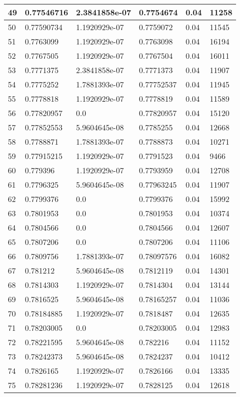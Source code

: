 \begin{longtable}{|l|l|l|l|l|l|}
49 & 0.77546716 & 2.3841858e-07 & 0.7754674 & 0.04 & 11258 \\ \hline 
50 & 0.77590734 & 1.1920929e-07 & 0.7759072 & 0.04 & 11545 \\ \hline 
51 & 0.7763099 & 1.1920929e-07 & 0.7763098 & 0.04 & 16194 \\ \hline 
52 & 0.7767505 & 1.1920929e-07 & 0.7767504 & 0.04 & 16011 \\ \hline 
53 & 0.7771375 & 2.3841858e-07 & 0.7771373 & 0.04 & 11907 \\ \hline 
54 & 0.7775252 & 1.7881393e-07 & 0.77752537 & 0.04 & 11945 \\ \hline 
55 & 0.7778818 & 1.1920929e-07 & 0.7778819 & 0.04 & 11589 \\ \hline 
56 & 0.77820957 & 0.0 & 0.77820957 & 0.04 & 15120 \\ \hline 
57 & 0.77852553 & 5.9604645e-08 & 0.7785255 & 0.04 & 12668 \\ \hline 
58 & 0.7788871 & 1.7881393e-07 & 0.7788873 & 0.04 & 10271 \\ \hline 
59 & 0.77915215 & 1.1920929e-07 & 0.7791523 & 0.04 & 9466 \\ \hline 
60 & 0.779396 & 1.1920929e-07 & 0.7793959 & 0.04 & 12708 \\ \hline 
61 & 0.7796325 & 5.9604645e-08 & 0.77963245 & 0.04 & 11907 \\ \hline 
62 & 0.7799376 & 0.0 & 0.7799376 & 0.04 & 15992 \\ \hline 
63 & 0.7801953 & 0.0 & 0.7801953 & 0.04 & 10374 \\ \hline 
64 & 0.7804566 & 0.0 & 0.7804566 & 0.04 & 12607 \\ \hline 
65 & 0.7807206 & 0.0 & 0.7807206 & 0.04 & 11106 \\ \hline 
66 & 0.7809756 & 1.7881393e-07 & 0.78097576 & 0.04 & 16082 \\ \hline 
67 & 0.781212 & 5.9604645e-08 & 0.7812119 & 0.04 & 14301 \\ \hline 
68 & 0.7814303 & 1.1920929e-07 & 0.7814304 & 0.04 & 13144 \\ \hline 
69 & 0.7816525 & 5.9604645e-08 & 0.78165257 & 0.04 & 11036 \\ \hline 
70 & 0.78184885 & 1.1920929e-07 & 0.7818487 & 0.04 & 12635 \\ \hline 
71 & 0.78203005 & 0.0 & 0.78203005 & 0.04 & 12983 \\ \hline 
72 & 0.78221595 & 5.9604645e-08 & 0.782216 & 0.04 & 11152 \\ \hline 
73 & 0.78242373 & 5.9604645e-08 & 0.7824237 & 0.04 & 10412 \\ \hline 
74 & 0.7826165 & 1.1920929e-07 & 0.7826166 & 0.04 & 13335 \\ \hline 
75 & 0.78281236 & 1.1920929e-07 & 0.7828125 & 0.04 & 12618 \\ \hline 
\end{longtable}
